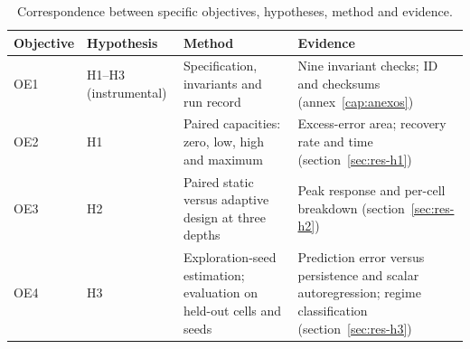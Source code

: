 \begin{table}[H]
\centering
\caption{Correspondence between specific objectives, hypotheses, method and evidence.}
\label{tab:oe-h}
\footnotesize
\setlength{\tabcolsep}{3pt}
\renewcommand{\arraystretch}{1.0}
\begin{tabularx}{\textwidth}{@{}l l >{\raggedright\arraybackslash}X >{\raggedright\arraybackslash}X@{}}
\toprule
Objective & Hypothesis & Method & Evidence \\
\midrule
OE1 & H1--H3 (instrumental) & Specification, invariants and run record & Nine invariant checks; ID and checksums (annex~\ref{cap:anexos}) \\
OE2 & H1 & Paired capacities: zero, low, high and maximum & Excess-error area; recovery rate and time (section~\ref{sec:res-h1}) \\
OE3 & H2 & Paired static versus adaptive design at three depths & Peak response and per-cell breakdown (section~\ref{sec:res-h2}) \\
OE4 & H3 & Exploration-seed estimation; evaluation on held-out cells and seeds & Prediction error versus persistence and scalar autoregression; regime classification (section~\ref{sec:res-h3}) \\
\bottomrule
\end{tabularx}
\end{table}
